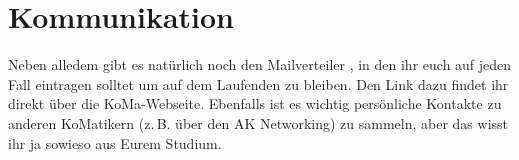 \chapter{Kommunikation}

Neben alledem gibt es natürlich noch den Mailverteiler
, in den ihr euch auf jeden Fall eintragen solltet um
auf dem Laufenden zu bleiben. Den Link dazu findet ihr direkt über die
KoMa-Webseite. Ebenfalls ist es wichtig persönliche Kontakte zu anderen
KoMatikern (z.\,B. über den AK Networking) zu sammeln, aber das wisst ihr ja
sowieso aus Eurem Studium.
